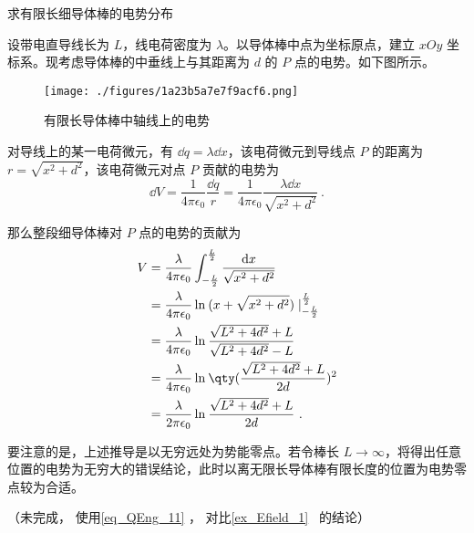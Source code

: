 \begin{example}{求有限长细导体棒的电势分布}

设带电直导线长为 $L$，线电荷密度为 $\lambda$。以导体棒中点为坐标原点，建立 $xOy$ 坐标系。现考虑导体棒的中垂线上与其距离为 $d$ 的 $P$ 点的电势。如下图所示。

\begin{figure}[ht]
\centering
\texttt{[image: ./figures/1a23b5a7e7f9acf6.png]}
\caption{有限长导体棒中轴线上的电势} \label{fig_QEng_2}
\end{figure}

对导线上的某一电荷微元，有 $\dd q=\lambda \dd x$，该电荷微元到导线点 $P$ 的距离为 $r=\sqrt{x^2+d^2}$，该电荷微元对点 $P$ 贡献的电势为
\begin{equation}
\dd V=\frac{1}{4\pi \epsilon_0}\frac{\dd q}{r}=\frac{1}{4\pi \epsilon_0}\frac{\lambda \dd x}{\sqrt{x^2+d^2}}~.
\end{equation}

那么整段细导体棒对 $P$ 点的电势的贡献为
\begin{equation}
\begin{aligned}
V &=\frac{\lambda }{4 \pi \epsilon_{0}}\int_{-\frac{L}{2}}^{\frac{L}{2}}\frac{\mathrm{d} x}{\sqrt{x^{2}+d^{2}}}\\
&=\frac{\lambda }{4 \pi \epsilon_{0}}\ln_{}{(x+\sqrt{x^2+d^2})}\mid_{-\frac{L}{2}}^{\frac{L}{2}}\\
&=\frac{\lambda }{4 \pi \epsilon_{0}}\ln_{}{\frac{\sqrt{L^2+4d^2}+L}{\sqrt{L^2+4d^2}-L}}\\
&=\frac{\lambda }{4 \pi \epsilon_{0}}\ln_{}{\qty(\frac{\sqrt{L^2+4d^2}+L}{2d})^2}\\
&=\frac{\lambda }{2 \pi \epsilon_{0}}\ln_{}{\frac{\sqrt{L^2+4d^2}+L}{2d}}~.
\end{aligned}
\end{equation}


要注意的是，上述推导是以无穷远处为势能零点。若令棒长 $L\rightarrow \infty$，将得出任意位置的电势为无穷大的错误结论，此时以离无限长导体棒有限长度的位置为电势零点较为合适。

（未完成， 使用\autoref{eq_QEng_11} ， 对比\autoref{ex_Efield_1}~ 的结论）

\end{example}

